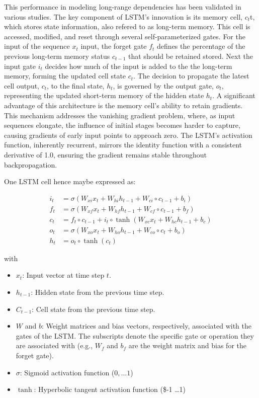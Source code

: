 \documentclass[
]{agujournal2019}
\providecommand{\tightlist}{%
  \setlength{\itemsep}{0pt}\setlength{\parskip}{0pt}}\usepackage{longtable,booktabs,array}
\begin{document}
This performance in modeling long-range dependencies has been validated
in various studies. The key component of LSTM's innovation is its memory
cell, \(c_t\)t, which stores state information, also refered to as
long-term memory. This cell is accessed, modified, and reset through
several self-parameterized gates. For the input of the sequence \(x_t\)
input, the forget gate \(f_t\) defines the percentage of the previous
long-term memory status \(c_{t-1}\) that should be retained
stored\hspace{0pt}. Next the input gate \(i_t\) decides how much of the
input is added to the the long-term memory, forming the updated cell
state \(c_{t}\). The decision to propagate the latest cell output,
\(c_t\), to the final state, \(h_t\), is governed by the output gate,
\(o_t\), representing the updated short-term memory of the hidden state
\(h_t\). A significant advantage of this architecture is the memory
cell's ability to retain gradients. This mechanism addresses the
vanishing gradient problem, where, as input sequences elongate, the
influence of initial stages becomes harder to capture, causing gradients
of early input points to approach zero. The LSTM's activation function,
inherently recurrent, mirrors the identity function with a consistent
derivative of 1.0, ensuring the gradient remains stable throughout
backpropagation.

One LSTM cell hence maybe expressed as:

\[
\begin{aligned}
i_t &= \sigma(W_{xi} x_t + W_{hi} h_{t-1} + W_{ci} \circ c_{t-1} + b_i) \\
f_t &= \sigma(W_{xf} x_t + W_{hf} h_{t-1} + W_{cf} \circ c_{t-1} + b_f) \\
c_t &= f_t \circ c_{t-1} + i_t \circ \tanh(W_{xc} x_t + W_{hc} h_{t-1} + b_c) \\
o_t &= \sigma(W_{xo} x_t + W_{ho} h_{t-1} + W_{co} \circ c_t + b_o) \\
h_t &= o_t \circ \tanh(c_t)
\end{aligned}
\]

with

\begin{itemize}
\tightlist
\item
  \(x_t\): Input vector at time step \(t\).
\item
  \(h_{t-1}\): Hidden state from the previous time step.
\item
  \(C_{t-1}\): Cell state from the previous time step.
\item
  \(W\) and \(b\): Weight matrices and bias vectors, respectively,
  associated with the gates of the LSTM. The subscripts denote the
  specific gate or operation they are associated with (e.g., \(W_f\) and
  \(b_f\) are the weight matrix and bias for the forget gate).
\item
  \(\sigma\): Sigmoid activation function (\(0,\ldots 1\))
\item
  \(\tanh\): Hyperbolic tangent activation function (\$-1 \ldots1)
\end{itemize}
\end{document}
